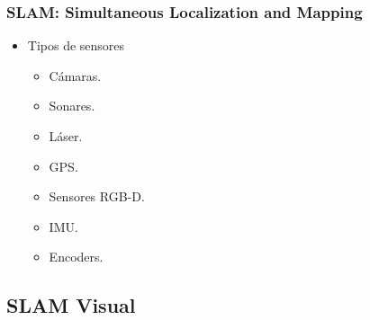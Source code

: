 \documentclass[compress]{beamer}
\begin{document}
\begin{frame}
\begin{figure}[!h]
{		}
	\end{figure}
\end{frame}


\begin{frame}
	\frametitle{SLAM: Simultaneous Localization and Mapping}

    \begin{itemize}
            \item Tipos de sensores
            \begin{itemize}
                \item Cámaras.
				\item Sonares.
				\item Láser.
				\item GPS.
				\item Sensores RGB-D.
				\item IMU.
				\item Encoders.
            \end{itemize}
    \end{itemize}
    

\end{frame}


\subsection{SLAM Visual}
\end{document}
